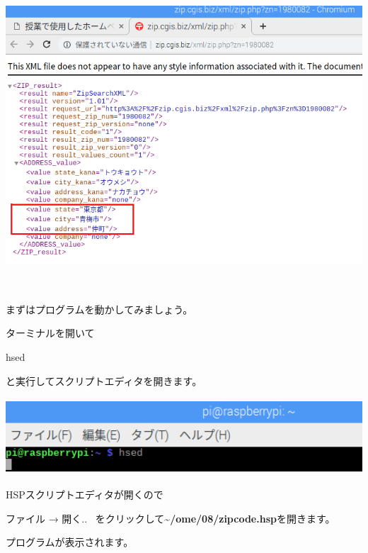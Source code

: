 \documentclass[a4paper,12pt,dvipdfmx]{jarticle}
\begin{document}
\begin{center}
\includegraphics[width=15.492cm,height=11.515cm]{textbook-img055.png}

\end{center}
\clearpage
まずはプログラムを動かしてみましょう。

ターミナルを開いて

hsed

と実行してスクリプトエディタを開きます。



\begin{center}
\includegraphics[width=17.057cm,height=2.866cm]{textbook-img013.png}

\end{center}
HSPスクリプトエディタが開くので

ファイル → 開く..
\ をクリックして\textbf{\~{}/ome/08/zipcode.hsp}を開きます。

プログラムが表示されます。
\end{document}

